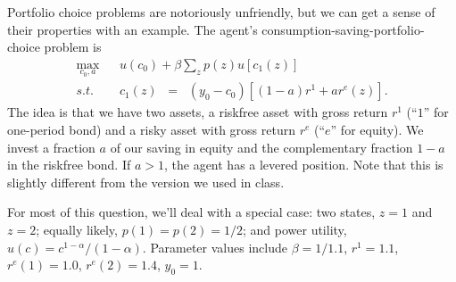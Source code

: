 \documentclass[11pt]{exam}
\begin{document}
\begin{questions}
\begin{solution}
\end{solution}


Portfolio choice problems are notoriously unfriendly,
but we can get a sense of their properties with an example.
The agent's consumption-saving-portfolio-choice problem is
\begin{eqnarray*}
   \max_{c_0, a} &&  u(c_0) + \beta \sum_z p(z) u[c_1(z)] \\
        s.t. &&  c_1(z)\;\;=\;\; (y_0-c_0)[(1-a) r^1 + a r^e(z)] .
\end{eqnarray*}
The idea is that we have two assets,
a riskfree asset with gross return $r^1$ (``$1$'' for one-period bond)
and a risky asset with gross return $r^e$  (``$e$'' for equity).
We invest a fraction $a$ of our saving in equity and the complementary
fraction $1-a$ in the riskfree bond.
If $a>1$, the agent has a levered position.
Note that this is slightly different from the version we used in class.

For most of this question, we'll deal with a special case:
two states, $z=1$ and $z=2$;
equally likely, $p(1) = p(2) = 1/2$;
and power utility, $u(c) = c^{1-\alpha}/(1-\alpha)$.
Parameter values include
$\beta = 1/1.1$,
$r^1 = 1.1$,
$r^e(1) = 1.0$, $r^e(2) = 1.4$,
$ y_0 = 1$.


\end{questions}
\end{document}
